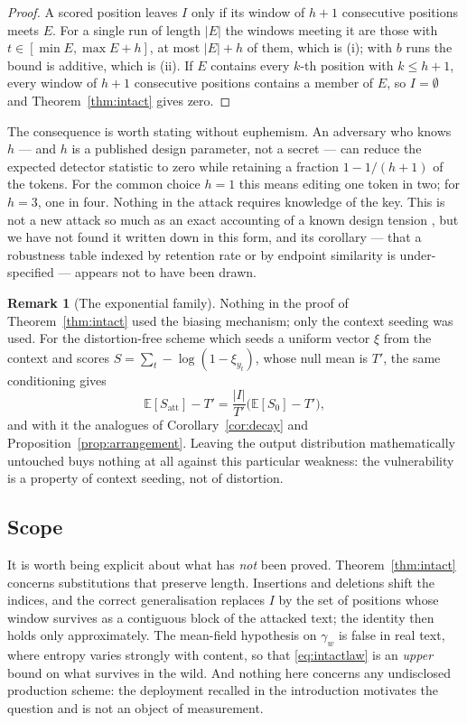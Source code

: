 \documentclass[11pt,a4paper]{article}
\theoremstyle{plain}
\theoremstyle{definition}
\newtheorem{remark}[theorem]{Remark}
\numberwithin{equation}{section}
\begin{document}
\begin{proof}
A scored position leaves $I$ only if its window of $h+1$ consecutive
positions meets $E$. For a single run of length $|E|$ the windows
meeting it are those with $t \in [\min E, \max E + h]$, at most
$|E|+h$ of them, which is (i); with $b$ runs the bound is additive,
which is (ii). If $E$ contains every $k$-th position with $k \le h+1$,
every window of $h+1$ consecutive positions contains a member of $E$, so
$I=\emptyset$ and Theorem~\ref{thm:intact} gives zero.
\end{proof}

The consequence is worth stating without euphemism. An adversary who
knows $h$ --- and $h$ is a published design parameter, not a secret ---
can reduce the expected detector statistic to zero while retaining a
fraction $1 - 1/(h+1)$ of the tokens. For the common choice $h=1$ this
means editing one token in two; for $h=3$, one in four. Nothing in the
attack requires knowledge of the key. This is not a new attack so much
as an exact accounting of a known design tension \cite{KGW24, NFL24},
but we have not found it written down in this form, and its corollary
--- that a robustness table indexed by retention rate or by endpoint
similarity is under-specified --- appears not to have been drawn.

\begin{remark}[The exponential family]\label{rem:exp}
Nothing in the proof of Theorem~\ref{thm:intact} used the biasing
mechanism; only the context seeding was used. For the distortion-free
scheme which seeds a uniform vector $\xi$ from the context and scores
$S = \sum_t -\log(1-\xi_{y_t})$, whose null mean is $T'$, the same
conditioning gives
\begin{equation}\label{eq:expfamily}
\mathbb{E}[S_{\mathrm{att}}] - T'
= \frac{|I|}{T'}\bigl(\mathbb{E}[S_0] - T'\bigr),
\end{equation}
and with it the analogues of Corollary~\ref{cor:decay} and
Proposition~\ref{prop:arrangement}. Leaving the output distribution
mathematically untouched buys nothing at all against this particular
weakness: the vulnerability is a property of context seeding, not of
distortion.
\end{remark}

\subsection{Scope}

It is worth being explicit about what has \emph{not} been proved.
Theorem~\ref{thm:intact} concerns substitutions that preserve length.
Insertions and deletions shift the indices, and the correct
generalisation replaces $I$ by the set of positions whose window
survives as a contiguous block of the attacked text; the identity then
holds only approximately. The mean-field hypothesis on $\gamma_w$ is
false in real text, where entropy varies strongly with content, so that
\eqref{eq:intactlaw} is an \emph{upper} bound on what survives in the
wild. And nothing here concerns any undisclosed production scheme: the
deployment recalled in the introduction motivates the question and is
not an object of measurement.
\end{document}
